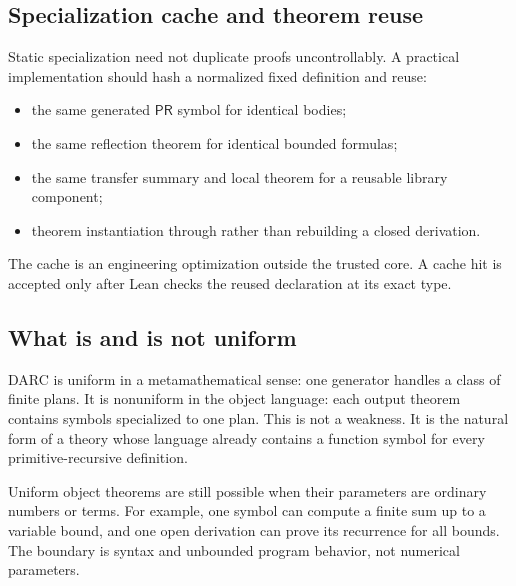 \subsection{Specialization cache and theorem reuse}

Static specialization need not duplicate proofs uncontrollably.  A practical
implementation should hash a normalized fixed definition and reuse:
\begin{itemize}
  \item the same generated \(\mathsf{PR}\) symbol for identical bodies;
  \item the same reflection theorem for identical bounded formulas;
  \item the same transfer summary and local theorem for a reusable library
        component;
  \item theorem instantiation through  rather than rebuilding
        a closed derivation.
\end{itemize}
The cache is an engineering optimization outside the trusted core.  A cache
hit is accepted only after Lean checks the reused declaration at its exact
type.

\subsection{What is and is not uniform}

DARC is uniform in a metamathematical sense: one generator handles a class of
finite plans.  It is nonuniform in the object language: each output theorem
contains symbols specialized to one plan.  This is not a weakness.  It is the
natural form of a theory whose language already contains a function symbol for
every primitive-recursive definition.

Uniform object theorems are still possible when their parameters are ordinary
numbers or terms.  For example, one symbol can compute a finite sum up to a
variable bound, and one open derivation can prove its recurrence for all
bounds.  The boundary is syntax and unbounded program behavior, not numerical
parameters.
